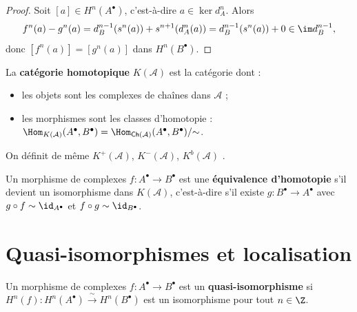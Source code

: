 \begin{proof}
Soit $[a] \in H^n(A^\bullet)$, c'est-à-dire $a \in \ker d_A^n$.
Alors
\[
  f^n(a) - g^n(a) = d_B^{n-1}(s^n(a)) + s^{n+1}(d_A^n(a))
  = d_B^{n-1}(s^n(a)) + 0 \in \im d_B^{n-1},
\]
donc $[f^n(a)] = [g^n(a)]$ dans $H^n(B^\bullet)$.
\end{proof}

\begin{definition}\label{def:homotopy-category}
La \textbf{catégorie homotopique} $K(\mathcal{A})$ est la catégorie dont :
\begin{itemize}
\item les objets sont les complexes de chaînes dans $\mathcal{A}$ ;
\item les morphismes sont les classes d'homotopie :
  $\Hom_{K(\mathcal{A})}(A^\bullet, B^\bullet)
  = \Hom_{\mathsf{Ch}(\mathcal{A})}(A^\bullet, B^\bullet) / {\sim}$.
\end{itemize}
On définit de même $K^+(\mathcal{A})$, $K^-(\mathcal{A})$,
$K^b(\mathcal{A})$%
.
\end{definition}

\begin{definition}\label{def:homotopy-equivalence}
Un morphisme de complexes $f \colon A^\bullet \to B^\bullet$ est une
\textbf{équivalence d'homotopie} s'il devient un isomorphisme dans
$K(\mathcal{A})$, c'est-à-dire s'il existe $g \colon B^\bullet \to A^\bullet$
avec $g \circ f \sim \id_{A^\bullet}$ et $f \circ g \sim \id_{B^\bullet}$.
\end{definition}


\section{Quasi-isomorphismes et localisation}\label{sec:quasi-iso}

\begin{definition}\label{def:quasi-iso}
Un morphisme de complexes $f \colon A^\bullet \to B^\bullet$ est un
\textbf{quasi-isomorphisme} si
$H^n(f) \colon H^n(A^\bullet) \xrightarrow{\;\sim\;} H^n(B^\bullet)$
est un isomorphisme pour tout $n \in \Z$.
\end{definition}

